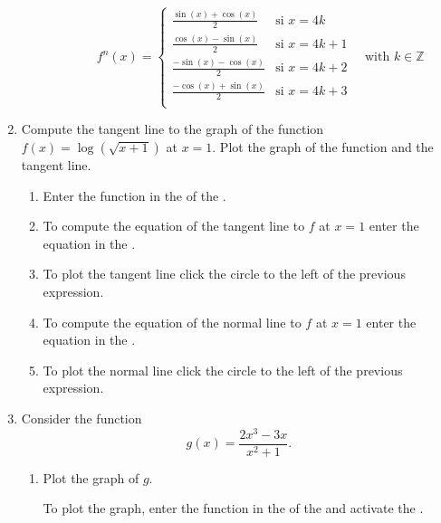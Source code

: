 \begin{enumerate}[leftmargin=*]
\begin{enumerate}
\begin{indication}
\begin{enumerate}
                  \[
                  f^n(x)=
                  \begin{cases}
                  \frac{\sin(x)+\cos(x)}{2}  & \mbox{si $x=4k$}   \\
                  \frac{\cos(x)-\sin(x)}{2}  & \mbox{si $x=4k+1$} \\
                  \frac{-\sin(x)-\cos(x)}{2} & \mbox{si $x=4k+2$} \\
                  \frac{-\cos(x)+\sin(x)}{2} & \mbox{si $x=4k+3$} \\
                  \end{cases}
                  \quad \mbox{with $k\in \mathbb{Z}$}
                  \]
            \end{enumerate}
            \end{indication}
      \end{enumerate}

\item Compute the tangent line to the graph of the function $f(x)=\log(\sqrt{x+1})$ at $x=1$.
Plot the graph of the function and the tangent line.
      \begin{indication}
      \begin{enumerate}
      \item Enter the function  in the  of the .
      \item To compute the equation of the tangent line to $f$ at $x=1$ enter the equation  in the .
      \item To plot the tangent line click the circle to the left of the previous expression.
      \item To compute the equation of the normal line to $f$ at $x=1$ enter the equation  in the .
      \item To plot the normal line click the circle to the left of the previous expression.
      \end{enumerate}
      \end{indication}


\item Consider the function
      \[
      g(x)=\dfrac{2x^{3}-3x}{x^{2}+1}.
      \]

      \begin{enumerate}
      \item Plot the graph of $g$.
            \begin{indication}
            To plot the graph, enter the function  in the  of the  and activate the .
            \end{indication}


\end{enumerate}
\end{enumerate}
